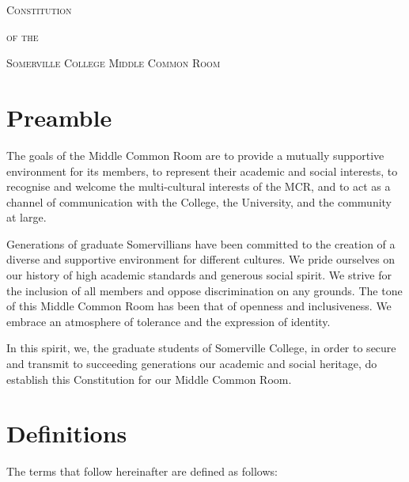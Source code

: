 \documentclass[11pt, a4paper]{article}
\begin{document}

\centerline{{\Huge \textsc{Constitution}}}
\vspace{2mm}
\centerline{{\Large \textsc{of the}}}
\vspace{2mm}
\centerline{{\Large \textsc{Somerville College Middle Common Room}}}





\section{Preamble}
\label{sec:preamble}

The goals of the Middle Common Room are to provide a mutually supportive environment for its members, to represent their academic and social interests, to recognise and welcome the multi-cultural interests of the MCR, and to act as a channel of communication with the College, the University, and the community at large.

Generations of graduate Somervillians have been committed to the creation of a diverse and supportive environment for different cultures. We pride ourselves on our history of high academic standards and generous social spirit.  We strive for the inclusion of all members and oppose discrimination on any grounds. The tone of this Middle Common Room has been that of openness and inclusiveness. We embrace an atmosphere of tolerance and the expression of identity.

In this spirit, we, the graduate students of Somerville College, in order to secure and transmit to succeeding generations our academic and social heritage, do establish this Constitution for our Middle Common Room.





\section{Definitions}
\label{sec:definitions}

The terms that follow hereinafter are defined as follows:
\end{document}
